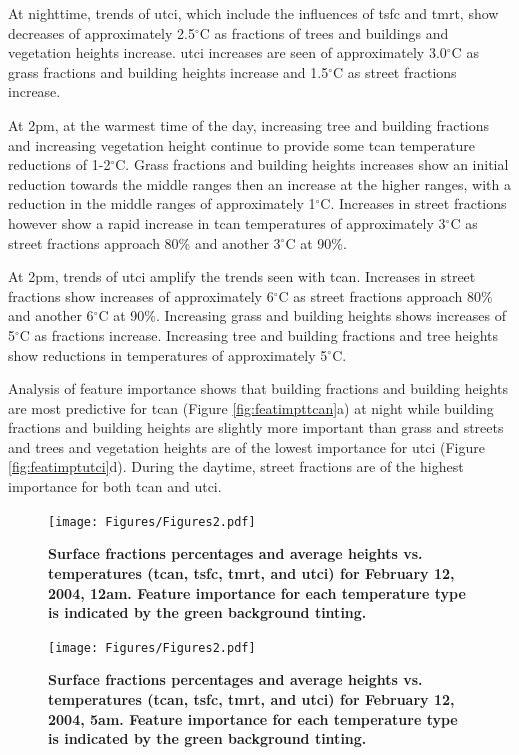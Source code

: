 \documentclass[final,3p,times,authoryear]{elsarticle}
\begin{document}
At nighttime, trends of \gls{utci}, which include the influences of \gls{tsfc} and \gls{tmrt}, show decreases of approximately 2.5$^{\circ}$C as fractions of trees and buildings and vegetation heights increase. \gls{utci} increases are seen of approximately 3.0$^{\circ}$C as grass fractions and building heights increase and 1.5$^{\circ}$C as street fractions increase.

At 2pm, at the warmest time of the day, increasing tree and building fractions and increasing vegetation height continue to provide some \gls{tcan} temperature reductions of 1-2$^{\circ}$C. Grass fractions and building heights increases show an initial reduction towards the middle ranges then an increase at the higher ranges, with a reduction in the middle ranges of approximately 1$^{\circ}$C. Increases in street fractions however show a rapid increase in \gls{tcan} temperatures of approximately 3$^{\circ}$C as street fractions approach 80\% and another 3$^{\circ}$C at 90\%.

At 2pm, trends of \gls{utci} amplify the trends seen with \gls{tcan}. Increases in street fractions show increases of approximately 6$^{\circ}$C as street fractions approach 80\% and another 6$^{\circ}$C at 90\%. Increasing grass and building heights shows increases of 5$^{\circ}$C as fractions increase. Increasing tree and building fractions and tree heights show reductions in temperatures of approximately 5$^{\circ}$C.

Analysis of feature importance shows that building fractions and building heights are most predictive for \gls{tcan} (Figure \ref{fig:featimpttcan}a) at night while building fractions and building heights are slightly more important than grass and streets and trees and vegetation heights are of the lowest importance for \gls{utci} (Figure  \ref{fig:featimptutci}d). During the daytime, street fractions are of the highest importance for both \gls{tcan} and \gls{utci}.

\begin{figure}
\centering
\texttt{[image: Figures/Figures2.pdf]}
\caption{\bf Surface fractions percentages and average heights vs. temperatures (\gls{tcan}, \gls{tsfc}, \gls{tmrt}, and \gls{utci}) for February 12, 2004, 12am. Feature importance for each temperature type is indicated by the green background tinting.}
 \label{fig:box0}
\end{figure} 

\begin{figure}
\centering
\texttt{[image: Figures/Figures2.pdf]}
\caption{\bf Surface fractions percentages and average heights vs. temperatures (\gls{tcan}, \gls{tsfc}, \gls{tmrt}, and \gls{utci}) for February 12, 2004, 5am. Feature importance for each temperature type is indicated by the green background tinting.}
 \label{fig:box5}
\end{figure} 
\end{document}
